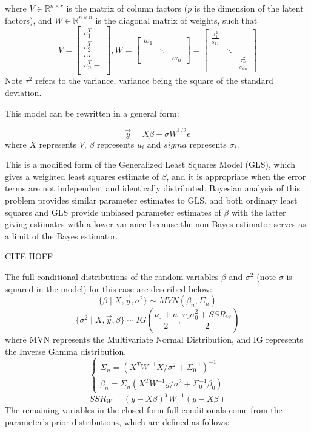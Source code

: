 \documentclass[12pt,twoside]{dukestatscithesis}
\theoremstyle{definition}
\theoremstyle{definition}
\theoremstyle{definition}
\theoremstyle{remark}
\begin{document}
where \(V \in \mathbb{R}^{n \times r}\) is the matrix of column factors
(\(p\) is the dimension of the latent factors), and
\(W \in \mathbb{R}^{n \times n}\) is the diagonal matrix of weights,
such that \[V =
  \begin{bmatrix}
    v_1^T- \\
    v_2^T- \\
    ... \\
    v_n^T- \\
  \end{bmatrix},
  W =
  \begin{bmatrix}
    w_{1} & & \\
    & \ddots & \\
    & & w_{n}
  \end{bmatrix} 
  = \begin{bmatrix}
    \frac{\tau_1^2}{s_{11}} & & \\
    & \ddots & \\
    & & \frac{\tau_n^2}{s_{nn}}
  \end{bmatrix}\]
Note \(\tau^2\) refers to the variance, variance being the square of the
standard deviation.

This model can be rewritten in a general form:

\[\vec{y} = X\beta + \sigma W^{1/2}\epsilon\] where \(X\) represents
\(V\), \(\beta\) represents \(u_i\) and \(sigma\) represents
\(\sigma_i\).

This is a modified form of the Generalized Least Squares Model (GLS),
which gives a weighted least squares estimate of \(\beta\), and it is
appropriate when the error terms are not independent and identically
distributed. Bayesian analysis of this problem provides similar
parameter estimates to GLS, and both ordinary least squares and GLS
provide unbiased parameter estimates of \(\beta\) with the latter giving
estimates with a lower variance because the non-Bayes estimator serves
as a limit of the Bayes estimator.

CITE HOFF

The full conditional distributions of the random variables \(\beta\) and
\(\sigma^2\) (note \(\sigma\) is squared in the model) for this case are
described below:
\[\{\beta \mid X, \vec{y}, \sigma^2\} \sim MVN (\beta_n, \Sigma_n)\]
\[\{\sigma^2 \mid X, \vec{y}, \beta\} \sim IG (\frac{\nu_0 + n}{2}, \frac{v_0\sigma^2_0 + SSR_W}{2})\]
where MVN represents the Multivariate Normal Distribution, and IG
represents the Inverse Gamma distribution. \[ \begin{cases}
      \Sigma_n = (X^TW^{-1}X/\sigma^2+\Sigma_0^{-1})^{-1}\\
      \beta_n = \Sigma_n(X^TW^{-1}y/\sigma^2 + \Sigma_0^{-1} \beta_0)
    \end{cases}\] \[SSR_W = (y - X\beta)^TW^{-1}(y-X\beta)\]
The remaining variables in the closed form full conditionals come from
the parameter's prior distributions, which are defined as follows:
\end{document}
